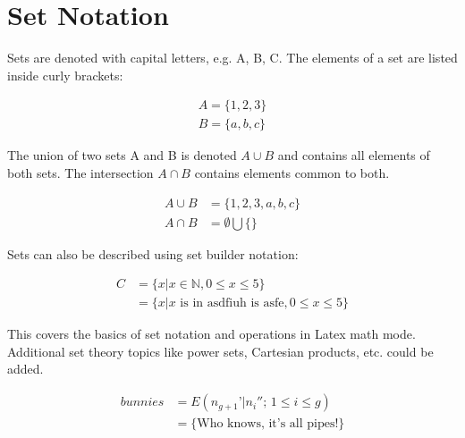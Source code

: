 \documentclass{article}
\begin{document}
\section{Set Notation}

Sets are denoted with capital letters, e.g. A, B, C. The elements of a set are listed inside curly brackets:

\begin{align}
A = \{1, 2, 3\} \\
B = \{a, b, c\}
\end{align}

The union of two sets A and B is denoted $A \cup B$ and contains all elements of both sets. The intersection $A \cap B$ contains elements common to both.

\begin{align}
A \cup B & = \{1, 2, 3, a, b, c\} \\
A \cap B & = \emptyset \bigcup \{\}
\end{align}

Sets can also be described using set builder notation:

\begin{align}
C & = \{x | x \in \mathbb{N}, 0 \leq x \leq 5\} \\
& = \{x |\textrm{$x$ is in asdfiuh is asfe}, 0 \leq x \leq 5\}
\end{align}

This covers the basics of set notation and operations in Latex math mode. Additional set theory topics like power sets, Cartesian products, etc. could be added.

\begin{align}
bunnies & = E(n_{g+1}’|n_i'';\,1\le i\le g) \\
& = \{\textrm{Who knows, it's all pipes!}\}
\end{align}
\end{document}
